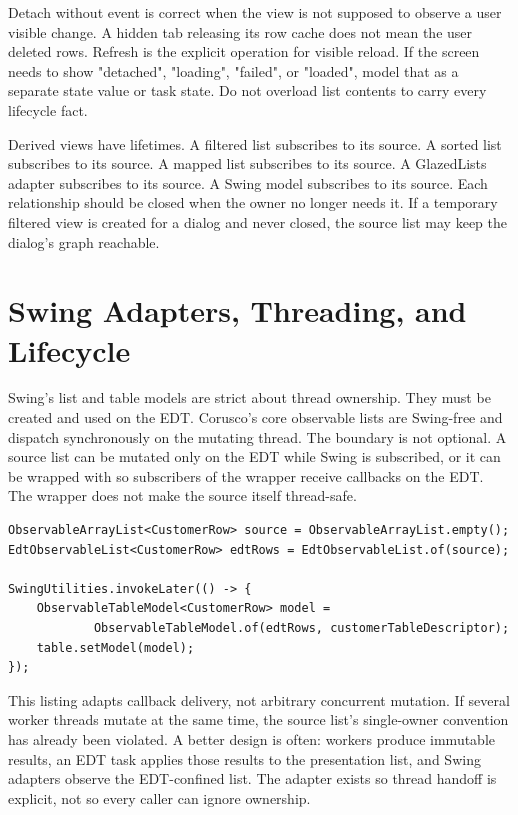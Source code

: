 Detach without event is correct when the view is not supposed to observe a user
visible change. A hidden tab releasing its row cache does not mean the user
deleted rows. Refresh is the explicit operation for visible reload. If the
screen needs to show "detached", "loading", "failed", or "loaded", model that as
a separate state value or task state. Do not overload list contents to carry
every lifecycle fact.

Derived views have lifetimes. A filtered list subscribes to its source. A sorted
list subscribes to its source. A mapped list subscribes to its source. A
GlazedLists adapter subscribes to its source. A Swing model subscribes to its
source. Each relationship should be closed when the owner no longer needs it.
If a temporary filtered view is created for a dialog and never closed, the source
list may keep the dialog's graph reachable.

\section{Swing Adapters, Threading, and Lifecycle}

Swing's list and table models are strict about thread ownership. They must be
created and used on the EDT. Corusco's core observable lists are Swing-free and
dispatch synchronously on the mutating thread. The boundary is not optional. A
source list can be mutated only on the EDT while Swing is subscribed, or it can
be wrapped with  so subscribers of the wrapper receive
callbacks on the EDT. The wrapper does not make the source itself thread-safe.

\begin{lstlisting}[caption={A background source still needs a coherent ownership policy.}]
ObservableArrayList<CustomerRow> source = ObservableArrayList.empty();
EdtObservableList<CustomerRow> edtRows = EdtObservableList.of(source);

SwingUtilities.invokeLater(() -> {
    ObservableTableModel<CustomerRow> model =
            ObservableTableModel.of(edtRows, customerTableDescriptor);
    table.setModel(model);
});
\end{lstlisting}

This listing adapts callback delivery, not arbitrary concurrent mutation.
If several worker threads mutate  at the same time, the source list's
single-owner convention has already been violated. A better design is often:
workers produce immutable results, an EDT task applies those results to the
presentation list, and Swing adapters observe the EDT-confined list. The adapter
exists so thread handoff is explicit, not so every caller can ignore ownership.

